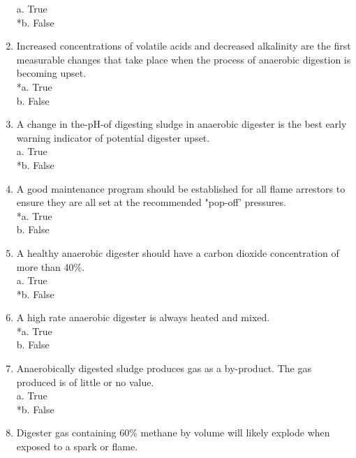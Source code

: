\begin{enumerate}
a. True \\
*b. False \\

\item  Increased concentrations of volatile acids and decreased alkalinity are the first measurable changes that take place when the process of anaerobic digestion is becoming upset. \\

*a. True \\
b. False \\

\item  A change in the-pH-of digesting sludge in anaerobic digester is the best early warning indicator of potential digester upset. \\

a. True \\
*b. False \\

\item  A good maintenance program should be established for all flame arrestors to ensure they are all set at the recommended "pop-off' pressures. \\

*a. True \\
b. False \\

\item  A healthy anaerobic digester should have a carbon dioxide concentration of more than 40\%. \\

a. True \\
*b. False \\

\item  A high rate anaerobic digester is always heated and mixed. \\

*a. True \\
b. False \\

\item  Anaerobically digested sludge produces gas as a by-product. The gas produced is of little or no value. \\

a. True \\
*b. False \\

\item  Digester gas containing 60\% methane by volume will likely explode when exposed to a spark or flame. \\


\end{enumerate}
